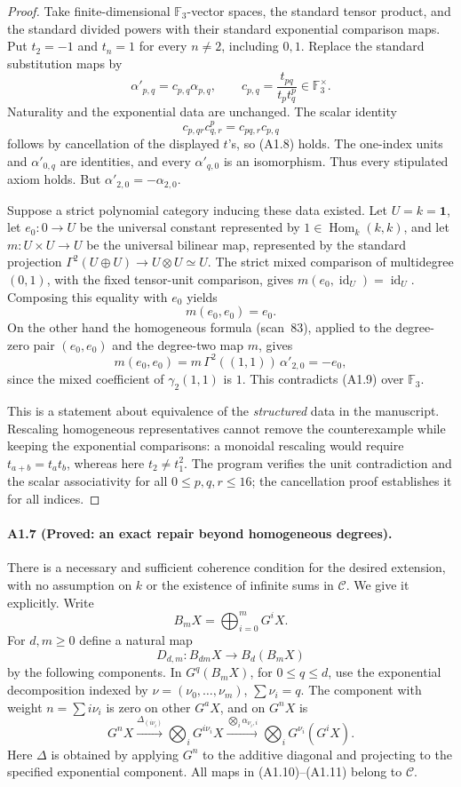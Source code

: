\begin{proof}
Take finite-dimensional $\mathbb F_3$-vector spaces, the standard tensor
product, and the standard divided powers with their standard exponential
comparison maps. Put $t_2=-1$ and $t_n=1$ for every $n\ne2$, including
$0,1$. Replace the standard substitution maps by
\[
 \alpha'_{p,q}=c_{p,q}\alpha_{p,q},\qquad
 c_{p,q}=\frac{t_{pq}}{t_p t_q^p}\in\mathbb F_3^\times.
\]
Naturality and the exponential data are unchanged. The scalar identity
\[
 c_{p,qr}c_{q,r}^p=c_{pq,r}c_{p,q}
\]
follows by cancellation of the displayed $t$'s, so (A1.8) holds. The
one-index units and $\alpha'_{0,q}$ are identities, and every
$\alpha'_{q,0}$ is an isomorphism. Thus every stipulated axiom holds.
But $\alpha'_{2,0}=-\alpha_{2,0}$.

Suppose a strict polynomial category inducing these data existed.
Let $U=k=\mathbf1$, let $e_0:0\to U$ be the universal constant
represented by $1\in\operatorname{Hom}_k(k,k)$, and let
$m:U\times U\to U$ be the universal bilinear map, represented by the
standard projection
$\Gamma^2(U\oplus U)\to U\otimes U\simeq U$.
The strict mixed comparison of multidegree $(0,1)$, with the fixed
tensor-unit comparison, gives $m(e_0,\operatorname{id}_U)
=\operatorname{id}_U$. Composing this equality with $e_0$ yields
\[
                 m(e_0,e_0)=e_0.
 \tag{A1.9}
\]
On the other hand the homogeneous formula (scan~83), applied to the
degree-zero pair $(e_0,e_0)$ and the degree-two map $m$, gives
\[
 m(e_0,e_0)=m\,\Gamma^2((1,1))\,\alpha'_{2,0}=-e_0,
\]
since the mixed coefficient of $\gamma_2(1,1)$ is $1$. This contradicts
(A1.9) over $\mathbb F_3$.

This is a statement about equivalence of the \emph{structured} data in
the manuscript. Rescaling homogeneous representatives cannot remove
the counterexample while keeping the exponential comparisons: a
monoidal rescaling would require $t_{a+b}=t_a t_b$, whereas here
$t_2\ne t_1^2$. The program verifies the unit contradiction and the
scalar associativity for all $0\leq p,q,r\leq16$; the cancellation
proof establishes it for all indices.
\end{proof}

\paragraph{A1.7 (Proved: an exact repair beyond homogeneous degrees).}
There is a necessary and sufficient coherence condition for the desired
extension, with no assumption on $k$ or the existence of infinite sums
in $\mathcal C$. We give it explicitly. Write
\[
 B_mX=\bigoplus_{i=0}^m G^iX.
\]
For $d,m\geq0$ define a natural map
\[
 D_{d,m}:B_{dm}X\longrightarrow B_d(B_mX)
 \tag{A1.10}
\]
by the following components. In $G^q(B_mX)$, for $0\leq q\leq d$,
use the exponential decomposition indexed by
$\nu=(\nu_0,\ldots,\nu_m)$, $\sum\nu_i=q$. The component with
weight $n=\sum i\nu_i$ is zero on other $G^aX$, and on $G^nX$ is
\[
 G^nX\xrightarrow{\Delta_{(i\nu_i)}}
 \bigotimes_iG^{i\nu_i}X
 \xrightarrow{\bigotimes_i\alpha_{\nu_i,i}}
 \bigotimes_iG^{\nu_i}(G^iX).
 \tag{A1.11}
\]
Here $\Delta$ is obtained by applying $G^n$ to the additive diagonal
and projecting to the specified exponential component. All maps in
(A1.10)--(A1.11) belong to $\mathcal C$.

